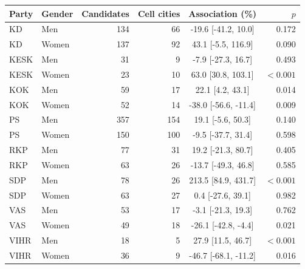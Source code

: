 \begin{tabular}{llrrcr}
\toprule
Party & Gender & Candidates & Cell cities & Association (\%) & $p$ \\
\midrule
KD & Men & 134 & 66 & -19.6 [-41.2, 10.0] & 0.172 \\
KD & Women & 137 & 92 & 43.1 [-5.5, 116.9] & 0.090 \\
KESK & Men & 31 & 9 & -7.9 [-27.3, 16.7] & 0.493 \\
KESK & Women & 23 & 10 & 63.0 [30.8, 103.1] & $<0.001$ \\
KOK & Men & 59 & 17 & 22.1 [4.2, 43.1] & 0.014 \\
KOK & Women & 52 & 14 & -38.0 [-56.6, -11.4] & 0.009 \\
PS & Men & 357 & 154 & 19.1 [-5.6, 50.3] & 0.140 \\
PS & Women & 150 & 100 & -9.5 [-37.7, 31.4] & 0.598 \\
RKP & Men & 77 & 31 & 19.2 [-21.3, 80.7] & 0.405 \\
RKP & Women & 63 & 26 & -13.7 [-49.3, 46.8] & 0.585 \\
SDP & Men & 78 & 26 & 213.5 [84.9, 431.7] & $<0.001$ \\
SDP & Women & 63 & 27 & 0.4 [-27.6, 39.1] & 0.982 \\
VAS & Men & 53 & 17 & -3.1 [-21.3, 19.3] & 0.762 \\
VAS & Women & 49 & 18 & -26.1 [-42.8, -4.4] & 0.021 \\
VIHR & Men & 18 & 5 & 27.9 [11.5, 46.7] & $<0.001$ \\
VIHR & Women & 36 & 9 & -46.7 [-68.1, -11.2] & 0.016 \\
\bottomrule
\end{tabular}
